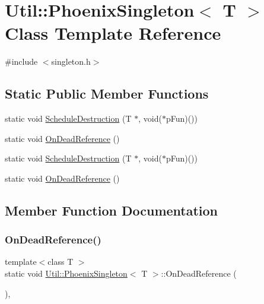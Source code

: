\hypertarget{classUtil_1_1PhoenixSingleton}{}\section{Util\+:\+:Phoenix\+Singleton$<$ T $>$ Class Template Reference}
\label{classUtil_1_1PhoenixSingleton}


{\ttfamily \#include $<$singleton.\+h$>$}

\subsection*{Static Public Member Functions}
\begin{DoxyCompactItemize}
\item 
static void \mbox{\hyperlink{classUtil_1_1PhoenixSingleton_ae72674e7906650e2377455c5a54af2fa}{Schedule\+Destruction}} (T $\ast$, void($\ast$p\+Fun)())
\item 
static void \mbox{\hyperlink{classUtil_1_1PhoenixSingleton_a6413ee75c9bf2023b4e49dc4a7d21328}{On\+Dead\+Reference}} ()
\item 
static void \mbox{\hyperlink{classUtil_1_1PhoenixSingleton_ae72674e7906650e2377455c5a54af2fa}{Schedule\+Destruction}} (T $\ast$, void($\ast$p\+Fun)())
\item 
static void \mbox{\hyperlink{classUtil_1_1PhoenixSingleton_a6413ee75c9bf2023b4e49dc4a7d21328}{On\+Dead\+Reference}} ()
\end{DoxyCompactItemize}


\subsection{Member Function Documentation}
\mbox{\label{classUtil_1_1PhoenixSingleton_a6413ee75c9bf2023b4e49dc4a7d21328}} 
\subsubsection{\texorpdfstring{OnDeadReference()}{OnDeadReference()}\hspace{0.1cm}{\footnotesize\ttfamily [1/2]}}
{\footnotesize\ttfamily template$<$class T $>$ \\
static void \mbox{\hyperlink{classUtil_1_1PhoenixSingleton}{Util\+::\+Phoenix\+Singleton}}$<$ T $>$\+::On\+Dead\+Reference (\begin{DoxyParamCaption}{ }\end{DoxyParamCaption})\hspace{0.3cm}{\ttfamily [inline]}, {\ttfamily [static]}}

